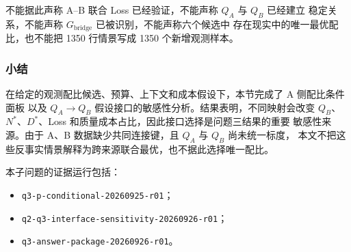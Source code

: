 不能据此声称 A--B 联合 Loss 已经验证，不能声称 $Q_A$ 与 $Q_B$ 已经建立
稳定关系，不能声称 $G_{\mathrm{bridge}}$ 已被识别，不能声称六个候选中
存在现实中的唯一最优配比，也不能把 1350 行情景写成 1350 个新增观测样本。

\subsubsection{小结}

在给定的观测配比候选、预算、上下文和成本假设下，本节完成了 A 侧配比条件面板
以及 $Q_A\to Q_B$ 假设接口的敏感性分析。结果表明，不同映射会改变
$Q_B$、$N^*$、$D^*$、Loss 和质量成本占比，因此接口选择是问题三结果的重要
敏感性来源。由于 A、B 数据缺少共同连接键，且 $Q_A$ 与 $Q_B$ 尚未统一标度，
本文不把这些反事实情景解释为跨来源联合最优，也不据此选择唯一配比。

本子问题的证据运行包括：
\begin{itemize}
  \item \texttt{q3-p-conditional-20260925-r01}；
  \item \texttt{q2-q3-interface-sensitivity-20260926-r01}；
  \item \texttt{q3-answer-package-20260926-r01}。
\end{itemize}
